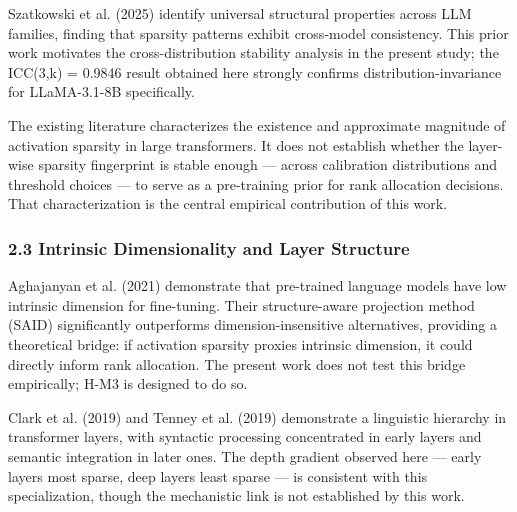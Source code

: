 Szatkowski et al. (2025) identify universal structural properties across LLM families, finding that sparsity patterns exhibit cross-model consistency. This prior work motivates the cross-distribution stability analysis in the present study; the ICC(3,k) = 0.9846 result obtained here strongly confirms distribution-invariance for LLaMA-3.1-8B specifically.

The existing literature characterizes the existence and approximate magnitude of activation sparsity in large transformers. It does not establish whether the layer-wise sparsity fingerprint is stable enough --- across calibration distributions and threshold choices --- to serve as a pre-training prior for rank allocation decisions. That characterization is the central empirical contribution of this work.

\subsubsection{2.3 Intrinsic Dimensionality and Layer Structure}

Aghajanyan et al. (2021) demonstrate that pre-trained language models have low intrinsic dimension for fine-tuning. Their structure-aware projection method (SAID) significantly outperforms dimension-insensitive alternatives, providing a theoretical bridge: if activation sparsity proxies intrinsic dimension, it could directly inform rank allocation. The present work does not test this bridge empirically; H-M3 is designed to do so.

Clark et al. (2019) and Tenney et al. (2019) demonstrate a linguistic hierarchy in transformer layers, with syntactic processing concentrated in early layers and semantic integration in later ones. The depth gradient observed here --- early layers most sparse, deep layers least sparse --- is consistent with this specialization, though the mechanistic link is not established by this work.

\begin{table}[htbp]
\centering
{}
\end{table}

